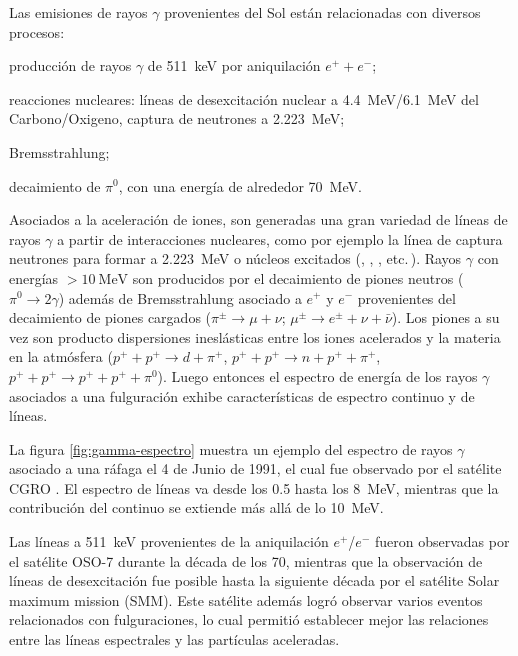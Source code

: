 Las emisiones de rayos $\gamma$ provenientes del Sol están relacionadas con diversos procesos:
\begin{enumerate*}
  \item producción de rayos $\gamma$ de \SI{511}{\kilo\electronvolt} por aniquilación $e^{+}+e^{-}$;
  \item reacciones nucleares: líneas de desexcitación nuclear a \SI{4.4}{\mega\electronvolt}/\SI{6.1}{\mega\electronvolt} del Carbono/Oxigeno, captura de neutrones a \SI{2.223}{\mega\electronvolt};
  \item Bremsstrahlung;
  \item decaimiento de $\pi^{0}$, con una energía de alrededor \SI{70}{\mega\electronvolt}.
\end{enumerate*}

Asociados a la aceleración de iones, son generadas una gran variedad de líneas de rayos $\gamma$ a partir de interacciones nucleares, como por ejemplo la línea de captura neutrones para formar  a  \SI{2.223}{\mega\electronvolt} o núcleos excitados (, , , etc.\,). Rayos $\gamma$ con energías $>\SI{10}{\mega\electronvolt}$ son producidos por el decaimiento de piones neutros ($\pi^{0}\rightarrow 2\gamma$) además de Bremsstrahlung asociado a $e^{+}$ y $e^{-}$ provenientes del decaimiento de piones cargados ($\pi^{\pm}\rightarrow\mu+\nu$; $\mu^{\pm}\rightarrow e^{\pm}+\nu+\bar{\nu}$). Los piones a su vez son producto dispersiones ineslásticas entre los iones acelerados y la materia en la atmósfera ($p^{+}+p^{+}\rightarrow d+\pi^{+}$, $p^{+}+p^{+}\rightarrow n+p^{+}+\pi^{+}$, $p^{+}+p^{+}\rightarrow p^{+}+p^{+}+\pi^{0}$). Luego entonces el espectro de energía de los rayos $\gamma$ asociados a una fulguración exhibe características de espectro continuo y de líneas.

La figura \ref{fig:gamma-espectro} muestra un ejemplo del espectro de rayos $\gamma$ asociado a una ráfaga el \num{4} de Junio de \num{1991}, el cual fue observado por el satélite CGRO \cite{murphy94}. El espectro de líneas va desde los \num{0.5} hasta los \SI{8}{\mega\electronvolt}, mientras que la contribución del continuo se extiende más allá de lo \SI{10}{\mega\electronvolt}.

Las líneas a \SI{511}{\kilo\electronvolt} provenientes de la aniquilación $e^{+}$/$e^{-}$ fueron observadas por el satélite OSO-7 durante la década de los \num{70}, mientras que la observación de líneas de desexcitación fue posible hasta la siguiente década por el satélite Solar maximum mission (SMM). Este satélite además logró observar varios eventos relacionados con fulguraciones, lo cual permitió establecer mejor las relaciones entre las líneas espectrales y las partículas aceleradas.

